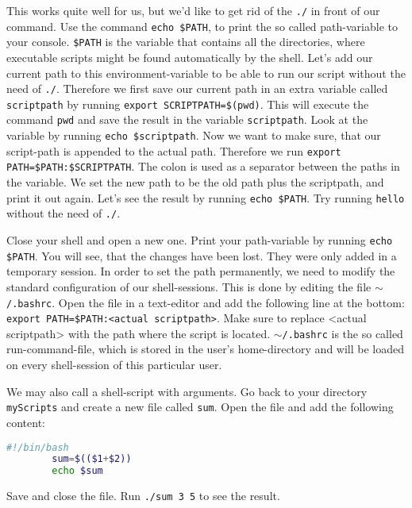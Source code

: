 \documentclass{dcbl/challenge}
\begin{document}
\begin{aufgabe}
    This works quite well for us, but we'd like to get rid of the \texttt{./} in front of our command. 
    Use the command \texttt{echo \$PATH}, to print the so called path-variable to your console.
    \texttt{\$PATH} is the variable that contains all the directories, where executable scripts might be found automatically by the shell.
    Let's add our current path to this environment-variable to be able to run our script without the need of \texttt{./}.
    Therefore we first save our current path in an extra variable called \texttt{scriptpath} by running \texttt{export SCRIPTPATH=\$(pwd)}. 
    This will execute the command \texttt{pwd} and save the result in the variable \texttt{scriptpath}.
    Look at the variable by running \texttt{echo \${scriptpath}}.
    Now we want to make sure, that our script-path is appended to the actual path.
    Therefore we run \texttt{export PATH=\$PATH:\$SCRIPTPATH}. 
    The colon is used as a separator between the paths in the variable.
    We set the new path to be the old path plus the scriptpath, and print it out again.
    Let's see the result by running \texttt{echo \$PATH}.
    Try running \texttt{hello} without the need of \texttt{./}.
\end{aufgabe}

\begin{aufgabe}
    Close your shell and open a new one.
    Print your path-variable by running \texttt{echo \$PATH}.
    You will see, that the changes have been lost. 
    They were only added in a temporary session. 
    In order to set the path permanently, we need to modify the standard configuration of our shell-sessions. 
    This is done by editing the file \texttt{$\sim$/.bashrc}.
    Open the file in a text-editor and add the following line at the bottom: \texttt{export PATH=\$PATH:<actual scriptpath>}.
    Make sure to replace <actual scriptpath> with the path where the script is located.
    \texttt{$\sim$/.bashrc} is the so called run-command-file, which is stored in the user's home-directory and will be loaded on every shell-session of this particular user.
\end{aufgabe}

\begin{aufgabe}
    We may also call a shell-script with arguments. 
    Go back to your directory \texttt{myScripts} and create a new file called \texttt{sum}.
    Open the file and add the following content:\\
    \begin{lstlisting}[language=bash, caption=Beispiel Shell-Script]
        #!/bin/bash
        sum=$(($1+$2))
        echo $sum
    \end{lstlisting}
    Save and close the file.
    Run \texttt{./sum 3 5} to see the result.
\end{aufgabe}
\end{document}
